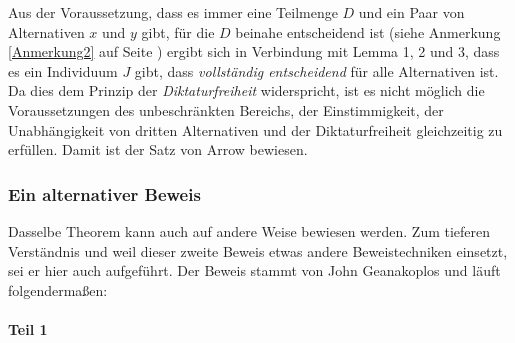 Aus der Voraussetzung, dass es immer eine Teilmenge $D$ und ein Paar von
Alternativen $x$ und $y$ gibt, für die $D$ beinahe entscheidend ist (siehe
Anmerkung \ref{Anmerkung2} auf Seite \pageref{Anmerkung2}) ergibt sich in
Verbindung mit Lemma 1, 2 und 3, dass es ein Individuum $J$ gibt, dass 
{\em vollständig entscheidend} für alle Alternativen ist. Da dies dem Prinzip
der {\em Diktaturfreiheit} widerspricht, ist es nicht möglich die
Voraussetzungen des unbeschränkten Bereichs, der Einstimmigkeit, der
Unabhängigkeit von dritten Alternativen und der Diktaturfreiheit
gleichzeitig zu erfüllen. Damit ist der Satz von Arrow bewiesen.

\subsubsection{Ein alternativer Beweis}
\label{AlternativerBeweis}

Dasselbe Theorem kann auch auf andere Weise bewiesen werden. Zum tieferen
Verständnis und weil dieser zweite Beweis etwas andere Beweistechniken
einsetzt, sei er hier auch aufgeführt. Der Beweis stammt von John Geanakoplos
\cite[]{geanakoplos:1996} und läuft folgendermaßen:

\paragraph{Teil 1}

